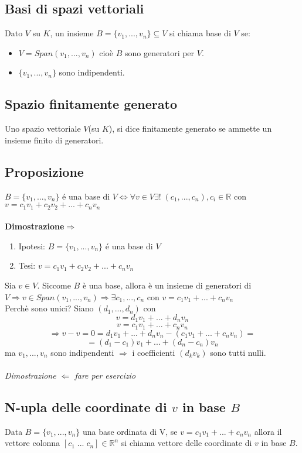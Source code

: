 \subsection{Basi di spazi vettoriali}
Dato \(V\) su \(K\), un insieme \(B=\{v_1,...,v_n\}\subseteq V\) si chiama base di \(V\) se:
\begin{itemize}

	\item \(V=Span(v_1,...,v_n)\) cioè \(B\) sono generatori per \(V\).

	\item \(\{v_1,...,v_n\}\) sono indipendenti.

\end{itemize}

\subsection{Spazio finitamente generato}
Uno spazio vettoriale $V$(su $K$), si dice finitamente generato se ammette un insieme finito di generatori.

\subsection{Proposizione}
$B=\{v_1,...,v_n\}$ é una base di $V\Leftrightarrow \forall v\in V\exists !\;(c_1,...,c_n),c_i\in\mathbb{R}$ con \\$v=c_1v_1+c_2v_2+...+c_nv_n$
\\
\\\textbf{Dimostrazione$\Rightarrow$}
\begin{enumerate}
	\item Ipotesi: $B=\{v_1,...,v_n\}$ é una base di $V$
	\item Tesi: $v=c_1v_1+c_2v_2+...+c_nv_n$
\end{enumerate}
 Sia $v\in V$. Siccome $B$ è una base, allora è un insieme di generatori di $V\Rightarrow v\in Span(v_1,...,v_n)\Rightarrow \exists c_1,...,c_n$ con $v=c_1v_1+...+c_nv_n$
 \\Perchè sono unici? Siano $(d_1,...,d_n)$ con 
 \[v=d_1v_1+...+d_nv_n\]
 \[v=c_1v_1+...+c_nv_n\]
 \[\Rightarrow v-v=0=d_1v_1+...+d_nv_n-(c_1v_1+...+c_nv_n)=\]
 \[=(d_1-c_1)v_1+...+(d_n-c_n)v_n\]
 ma $v_1,...,v_n$ sono indipendenti $\Rightarrow$ i coefficienti $(d_kv_k)$ sono tutti nulli.
 \\
 \\\textit{Dimostrazione $\Leftarrow$ fare per esercizio}

 \subsection{N-upla delle coordinate di $v$ in base $B$}
 Data $B=\{v_1,...,v_n\}$ una base ordinata di V, se $v=c_1v_1+...+c_nv_n$ allora il vettore colonna $[c_1\;...\;c_n]\in\mathbb{R}^n$ si chiama vettore delle coordinate di $v$ in base $B$.

